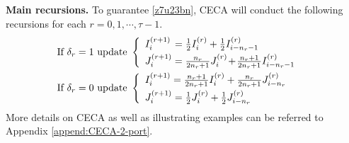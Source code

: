 \documentclass{article}
\newcommand{\ro}{{(r)}}
\theoremstyle{plain}
\theoremstyle{definition}
\begin{document}
\textbf{Main recursions.} To guarantee \eqref{z7u23bn}, CECA will conduct the following recursions for each $r=0,1,\cdots, \tau-1$.
\begin{align*}
&\mbox{If $\delta_r=1$ update }\left\{
\begin{array}{lc}
I^{(r+1)}_i \hspace{0.5mm} =\frac{1}{2}I^\ro_i+\frac{1}{2}I^\ro_{i-n_r-1}     &  \vspace{1mm}\\
J^{(r+1)}_i=\frac{n_r}{2n_r+1}J^\ro_i \hspace{-0.5mm}+\hspace{-0.5mm} \frac{n_r+1}{2n_r+1}I^\ro_{i-n_r-1}     & 
\end{array}
\right. \vspace{2mm}\\
&\mbox{If $\delta_r=0$ update }\left\{
\begin{array}{lc}
I^{(r+1)}_i=\frac{n_r+1}{2n_r+1}I^\ro_i+\frac{n_r}{2n_r+1}J^\ro_{i-n_r}     &  \vspace{1mm}\\
J^{(r+1)}_i=\frac{1}{2}J^\ro_i+\frac{1}{2}J^\ro_{i-n_r}     & 
\end{array}
\right.
\end{align*}
More details on CECA as well as illustrating examples can be referred to Appendix \ref{append:CECA-2-port}. 
\end{document}
